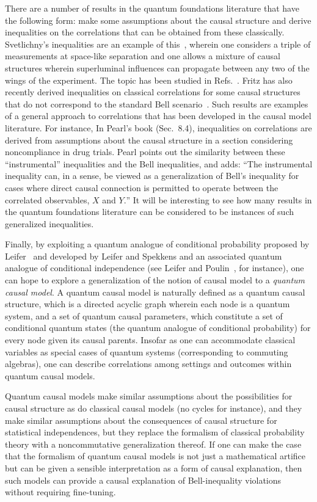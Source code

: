 \documentclass[letterpaper,onecolumn,nofootinbib]{revtex4}
\begin{document}
There are a number of results in the quantum foundations literature that
have the following form: make some assumptions about the causal structure
and derive inequalities on the correlations that can be obtained from these classically.
Svetlichny's inequalities are an example of this~\cite{Svetlichny1987}, wherein one considers a
triple of measurements at space-like separation and one allows a mixture of
causal structures wherein superluminal influences can propagate between any
two of the wings of the experiment. The topic has been studied in Refs.~\cite{Mitchell2004, Acin2011,Barrett2011}.  Fritz has also recently derived inequalities on classical correlations for some causal structures that do not correspond to the standard Bell scenario~\cite{Fritz2012}.
Such results are examples of a general approach to correlations that has
been developed in the causal model literature. For instance, In Pearl's book (Sec.~8.4), inequalities on correlations are derived from assumptions about
the causal structure in a section considering noncompliance in drug trials.
Pearl points out the similarity between these ``instrumental'' inequalities and the Bell
inequalities, and adds: ``The instrumental inequality can, in a sense,
be viewed as a generalization of Bell's inequality for cases where direct
causal connection is permitted to operate between the correlated
observables, $X$ and $Y.$'' It will be interesting to see
how many results in the quantum foundations literature can be considered to
be instances of such generalized inequalities.

Finally, by exploiting a quantum analogue of conditional probability
proposed by Leifer~\cite{Leifer2006a} and developed by Leifer and Spekkens \cite{Leifer2011,Leifer2011a} and an
associated quantum analogue of conditional independence (see Leifer and
Poulin~\cite{Leifer2008}, for instance), one can hope to explore a generalization of
the notion of causal model to a \emph{quantum causal model}. A quantum
causal model is naturally defined as a quantum causal structure, which is a
directed acyclic graph wherein each node is a quantum system, and a set of
quantum causal parameters, which constitute a set of conditional quantum
states (the quantum analogue of conditional probability) for every node
given its causal parents. Insofar as one can accommodate classical
variables as special cases of quantum systems (corresponding to commuting
algebras), one can describe correlations among
settings and outcomes within quantum causal models.

Quantum causal models make similar assumptions about the possibilities
for causal structure as do classical causal models (no cycles for instance),
and they make similar assumptions about the consequences of causal structure
for statistical independences, but they replace the formalism of
classical probability theory with a noncommutative generalization thereof.
If one can make the case that the formalism of quantum causal models is not just a mathematical artifice but can be given a sensible interpretation as a form of causal explanation, then such models can provide a causal explanation of Bell-inequality violations without requiring fine-tuning.
\end{document}
